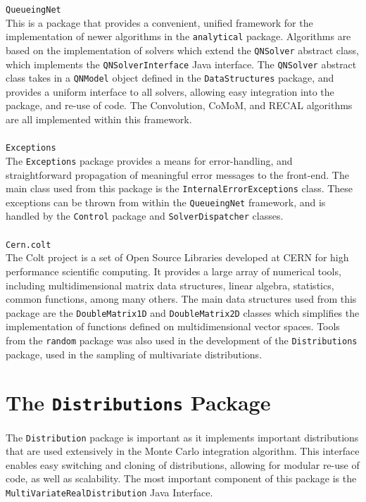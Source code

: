 {\large \texttt{QueueingNet} }\\
This is a package that provides a convenient, unified framework for the implementation of newer algorithms in the \texttt{analytical} package. Algorithms are based on the implementation of solvers which extend the \texttt{QNSolver} abstract class, which implements the \texttt{QNSolverInterface} Java interface. The \texttt{QNSolver} abstract class takes in a \texttt{QNModel} object defined in the \texttt{DataStructures} package, and provides a uniform interface to all solvers, allowing easy integration into the package, and re-use of code. The Convolution, CoMoM, and RECAL algorithms are all implemented within this framework.
\\\\
{\large \texttt{Exceptions} }\\
The \texttt{Exceptions} package provides a means for error-handling, and straightforward propagation of meaningful error messages to the front-end. The main class used from this package is the \texttt{InternalErrorExceptions} class. These exceptions can be thrown from within the \texttt{QueueingNet} framework, and is handled by the \texttt{Control} package and \texttt{SolverDispatcher} classes.
\\\\
{\large \texttt{Cern.colt} }\\
The Colt project is a set of Open Source Libraries developed at CERN for high performance scientific computing. It provides a large array of numerical tools, including multidimensional matrix data structures, linear algebra, statistics, common functions, among many others. The main data structures used from this package are the \texttt{DoubleMatrix1D} and \texttt{DoubleMatrix2D} classes which simplifies the implementation of functions defined on multidimensional vector spaces. Tools from the \texttt{random} package was also used in the development of the \texttt{Distributions} package, used in the sampling of multivariate distributions.

\section{The \texttt{Distributions} Package}
The \texttt{Distribution}  package is important as it implements important distributions that are used extensively in the Monte Carlo integration algorithm. This interface enables easy switching and cloning of distributions, allowing for modular re-use of code, as well as scalability. The most important component of this package is the \texttt{MultiVariateRealDistribution} Java Interface.

